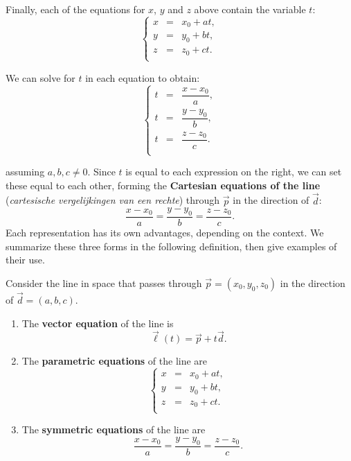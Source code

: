 Finally, each of the equations for $x$, $y$ and $z$ above contain the variable $t$:
$$
\left\{
\begin{array}{lcl}
x &=& x_0+at,\\
y&=&y_0+bt, \\
z &=& z_0+ct.\\
\end{array}
\right.
$$

We can solve for $t$ in each equation to obtain:
\renewcommand{\arraystretch}{2}
$$
\left\{
\begin{array}{lcl}
 t&=&\dfrac{x-x_0}{a},\\
 t &=& \dfrac{y-y_0}{b},\\
 t &=& \dfrac{z-z_0}{c}.\\
\end{array}
\right.
$$
\renewcommand{\arraystretch}{1}

assuming $a,b,c\neq 0$.
Since $t$ is equal to each expression on the right, we can set these equal to each other, forming the \textbf{Cartesian equations of the line} (\textit{cartesische vergelijkingen van een rechte}) through $\vec p$ in the direction of $\vec d$:
$$\frac{x-x_0}{a} = \frac{y-y_0}{b}=\frac{z-z_0}{c}.$$
Each representation has its own advantages, depending on the context. We summarize these three forms in the following definition, then give examples of their use.
 

\begin{definition}\label{def:lines}
Consider the line in space that passes through $\vec p = (x_0,y_0,z_0)$ in the direction of $\vec d = ( a,b,c).$
\begin{enumerate}[align=left]
	\item The \textbf{vector equation} of the line is $$\vec \ell(t) = \vec p+t\vec d.$$
	\item The \textbf{parametric equations} of the line are
	$$
\left\{
\begin{array}{lcl}
x &=& x_0+at,\\
y&=&y_0+bt, \\
z &=& z_0+ct.\\
\end{array}
\right.
$$

	\item The \textbf{symmetric equations} of the line are
	$$\frac{x-x_0}{a} = \frac{y-y_0}{b}=\frac{z-z_0}{c}.$$
\end{enumerate}
\end{definition}


